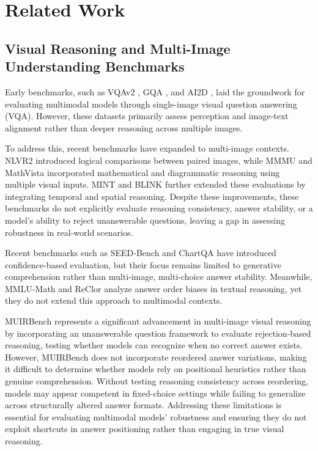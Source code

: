 \section{Related Work}
\label{sec:related_work}



\subsection{Visual Reasoning and Multi-Image Understanding Benchmarks}
Early benchmarks, such as VQAv2 \cite{goyal2017making}, GQA \cite{hudson2019gqa}, and AI2D \cite{kembhavi2016diagram}, laid the groundwork for evaluating multimodal models through single-image visual question answering (VQA). However, these datasets primarily assess perception and image-text alignment rather than deeper reasoning across multiple images.

To address this, recent benchmarks have expanded to multi-image contexts. NLVR2 \cite{suhr2019nlvr2} introduced logical comparisons between paired images, while MMMU \cite{yue2024mmmu} and MathVista \cite{mathvista} incorporated mathematical and diagrammatic reasoning using multiple visual inputs. MINT \cite{wang2023mint} and BLINK \cite{fu2024blink} further extended these evaluations by integrating temporal and spatial reasoning. Despite these improvements, these benchmarks do not explicitly evaluate reasoning consistency, answer stability, or a model’s ability to reject unanswerable questions, leaving a gap in assessing robustness in real-world scenarios.

Recent benchmarks such as SEED-Bench \cite{li2023seedbench} and ChartQA \cite{masry2022chartqa} have introduced confidence-based evaluation, but their focus remains limited to generative comprehension rather than multi-image, multi-choice answer stability. Meanwhile, MMLU-Math \cite{mathmmlu2023} and ReClor \cite{yu2020reclor} analyze answer order biases in textual reasoning, yet they do not extend this approach to multimodal contexts.

MUIRBench \cite{wang2024muirbench} represents a significant advancement in multi-image visual reasoning by incorporating an unanswerable question framework to evaluate rejection-based reasoning, testing whether models can recognize when no correct answer exists. However, MUIRBench does not incorporate reordered answer variations, making it difficult to determine whether models rely on positional heuristics rather than genuine comprehension. Without testing reasoning consistency across reordering, models may appear competent in fixed-choice settings while failing to generalize across structurally altered answer formats. Addressing these limitations is essential for evaluating multimodal models’ robustness and ensuring they do not exploit shortcuts in answer positioning rather than engaging in true visual reasoning.


